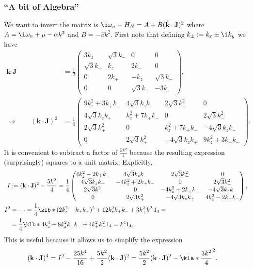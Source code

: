 \documentclass[english, parskip=full]{scrartcl}
\begin{document}
\subsubsection{``A bit of Algebra''}
We want to invert the matrix is $\i\omega_n - H_N = A+B(\hat{\textbf{k}}\cdot \textbf{J})^2$ where $A=\i\omega_n + \mu - \alpha k^2$ and $B=-\beta k^2$.
First note that defining $k_\pm := k_x\pm\i k_y$ we have
\begin{align}
\textbf{k}\cdot \textbf{J} &= \frac{1}{2}\begin{pmatrix}
3k_z & \sqrt{3}k_- & 0 & 0\\
\sqrt{3}k_+ & k_z & 2k_- & 0\\
0 & 2k_+ & -k_z & \sqrt{3}k_-\\
0 & 0 & \sqrt{3}k_+ & -3k_z
\end{pmatrix},\\
\Rightarrow\qquad (\textbf{k}\cdot \textbf{J})^2 &= \frac{1}{4} \begin{pmatrix}
9k_z^2 + 3k_+k_- & 4\sqrt{3}k_zk_- & 2\sqrt{3}k_-^2 & 0\\
4\sqrt{3}k_zk_+ & k_z^2 + 7k_+k_- & 0 & 2\sqrt{3}k_-^2\\
2\sqrt{3}k_+^2 & 0 & k_z^2 + 7k_+k_- & -4\sqrt{3}k_zk_-\\
0 & 2\sqrt{3}k_+^2 & -4\sqrt{3}k_zk_+ & 9k_z^2 + 3k_+k_-
\end{pmatrix}.
\end{align}
It is convenient to subtract a factor of $\frac{5k^2}{4}$ because the resulting expression (surprisingly) squares to a unit matrix.
Explicitly,
\begin{align}
I &:= (\textbf{k}\cdot \textbf{J})^2 - \frac{5k^2}{4} = \frac{1}{4} \begin{pmatrix}
4k_z^2 -2k_+k_- & 4\sqrt{3}k_zk_- & 2\sqrt{3}k_-^2 & 0\\
4\sqrt{3}k_zk_+ & -4k_z^2 + 2k_+k_- & 0 & 2\sqrt{3}k_-^2\\
2\sqrt{3}k_+^2 & 0 & -4k_z^2 + 2k_+k_- & -4\sqrt{3}k_zk_-\\
0 & 2\sqrt{3}k_+^2 & -4\sqrt{3}k_zk_+ & 4k_z^2 -2k_+k_-
\end{pmatrix},\\
I^2 &= \dots = \frac{1}{4} \klb*{(2k_z^2 - k_+k_-)^2 + 12k_z^2k_+k_- + 3k_+^2k_-^2} 1_4 = \\
&= \frac{1}{4} \klb*{4k_z^4 + 8k_z^2k_+k_- + 4k_+^2k_-^2} 1_4 = k^4 1_4.
\end{align}
This is useful because it allows us to simplify the expression
\begin{align}
(\textbf{k}\cdot \textbf{J})^4 &= I^2 - \frac{25k^4}{16} + \frac{5k^2}{2}(\textbf{k}\cdot \textbf{J})^2 = \frac{5k^2}{2}(\textbf{k}\cdot \textbf{J})^2 - \kla*{\frac{3k^2}{4}}^2.
\end{align}
\end{document}
